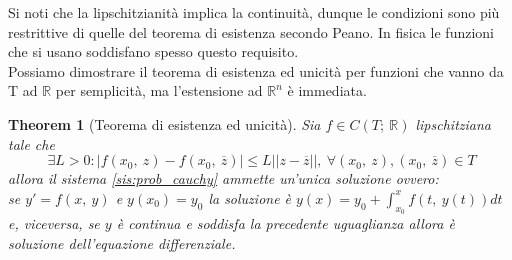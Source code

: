 \documentclass[10pt,a4paper]{article}
\newtheorem{theorem}{Theorem}
\begin{document}
Si noti che la lipschitzianità implica la continuità, dunque le condizioni sono più restrittive di quelle del teorema di esistenza secondo Peano. In fisica le funzioni che si usano soddisfano spesso questo requisito.\\
Possiamo dimostrare il teorema di esistenza ed unicità per funzioni che vanno da T ad $\mathbb{R}$ per semplicità, ma l'estensione ad $\mathbb{R}^n$ è immediata. 
\begin{theorem}[Teorema di esistenza ed unicità]
	Sia \(f\in C(T;\ \mathbb{R})\) lipschitziana tale che 
	\[\ \exists L>0: |f(x_0,\ z)-f(x_0,\ \overline{z})|\leq L||z-\overline{z}||,\ \forall (x_0,\ z), (x_0,\ \overline{z})\in T\]
	allora il sistema \ref{sis:prob_cauchy} ammette un'unica soluzione ovvero:\\
	se \(y' = f(x,\ y)\) e \(y(x_0) = y_0\) la soluzione è \(y(x) = y_0 + \int_{x_0}^{x} f(t,\ y(t))dt\) e, viceversa, se \(y\) è continua e soddisfa la precedente uguaglianza allora è soluzione dell'equazione differenziale. 
\end{theorem}
\end{document}
